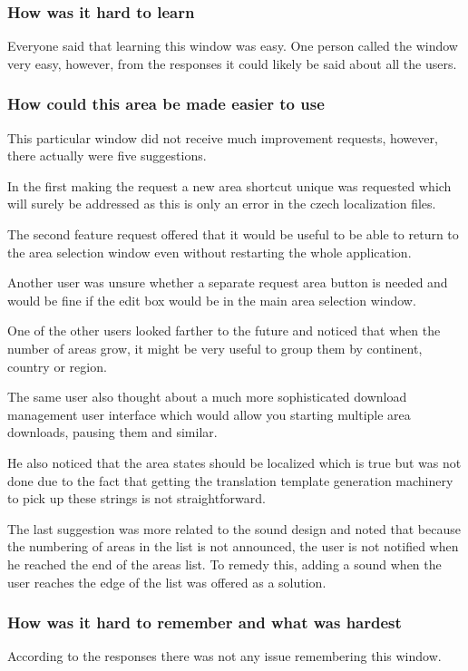 \documentclass[nolof,digital]{fithesis3}
\begin{document}
\subsubsection{How was it hard to learn}
Everyone said that learning this window was easy. One person called the window very easy, however, from the responses it could likely be said about all the users.
\subsubsection{How could this area be made easier to use}
This particular window did not receive much improvement requests, however, there actually were five suggestions.

In the first making the request a new area shortcut unique was requested which will surely be addressed as this is only an error in the czech localization files.

The second feature request offered that it would be useful to be able to return to the area selection window even without restarting the whole application.

Another user was unsure whether a separate request area button is needed and would be fine if the edit box would be in the main area selection window.

One of the other users looked farther to the future and noticed that when the number of areas grow, it might be very useful to group them by continent, country or region.

The same user also thought about a much more sophisticated download management user interface which would allow you starting multiple area downloads, pausing them and similar.

He also noticed that the area states should be localized which is true but was not done due to the fact that getting the translation template generation machinery to pick up these strings is not straightforward.

The last suggestion was more related to the sound design and noted that because the numbering of areas in the list is not announced, the user is not notified when he reached the end of the areas list. To remedy this, adding a sound when the user reaches the edge of the list was offered as a solution.
\subsubsection{How was it hard to remember and what was hardest}
According to the responses there was not any issue remembering this window.
\end{document}
